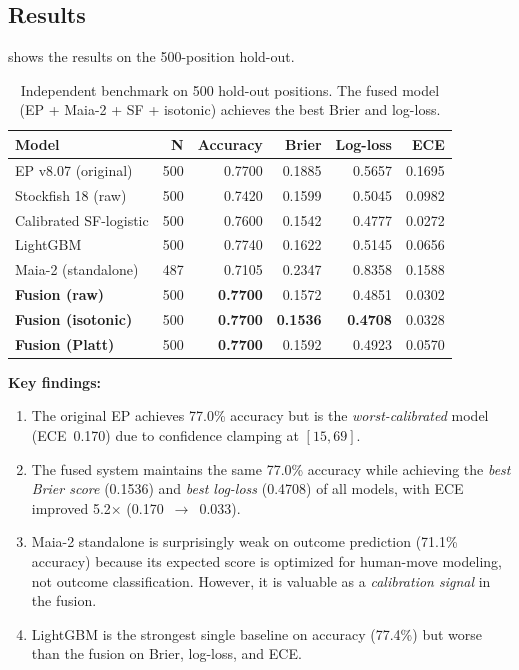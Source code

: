 \documentclass[11pt,a4paper]{article}
\begin{document}
\subsection{Results}

 shows the results on the 500-position hold-out.

\begin{table}[h]
\centering
\caption{Independent benchmark on 500 hold-out positions. The fused model
(EP + Maia-2 + SF + isotonic) achieves the best Brier and log-loss.}
\label{tab:benchmark}
\begin{tabular}{lrrrrr}
\toprule
\textbf{Model} & \textbf{N} & \textbf{Accuracy} & \textbf{Brier} & \textbf{Log-loss} & \textbf{ECE} \\
\midrule
EP v8.07 (original)     & 500 & 0.7700 & 0.1885 & 0.5657 & 0.1695 \\
Stockfish 18 (raw)      & 500 & 0.7420 & 0.1599 & 0.5045 & 0.0982 \\
Calibrated SF-logistic  & 500 & 0.7600 & 0.1542 & 0.4777 & 0.0272 \\
LightGBM                & 500 & 0.7740 & 0.1622 & 0.5145 & 0.0656 \\
Maia-2 (standalone)     & 487 & 0.7105 & 0.2347 & 0.8358 & 0.1588 \\
\midrule
\textbf{Fusion (raw)}   & 500 & \textbf{0.7700} & 0.1572 & 0.4851 & 0.0302 \\
\textbf{Fusion (isotonic)} & 500 & \textbf{0.7700} & \textbf{0.1536} & \textbf{0.4708} & 0.0328 \\
\textbf{Fusion (Platt)} & 500 & \textbf{0.7700} & 0.1592 & 0.4923 & 0.0570 \\
\bottomrule
\end{tabular}
\end{table}

\textbf{Key findings:}

\begin{enumerate}[nosep]
  \item The original EP achieves 77.0\% accuracy but is the
        \emph{worst-calibrated} model (ECE~0.170) due to confidence
        clamping at $[15, 69]$.
  \item The fused system maintains the same 77.0\% accuracy while achieving
        the \emph{best Brier score} (0.1536) and \emph{best log-loss}
        (0.4708) of all models, with ECE improved 5.2$\times$ (0.170~$\to$~0.033).
  \item Maia-2 standalone is surprisingly weak on outcome prediction
        (71.1\% accuracy) because its expected score is optimized for
        human-move modeling, not outcome classification. However, it is
        valuable as a \emph{calibration signal} in the fusion.
  \item LightGBM is the strongest single baseline on accuracy (77.4\%) but
        worse than the fusion on Brier, log-loss, and ECE.
\end{enumerate}
\end{document}
